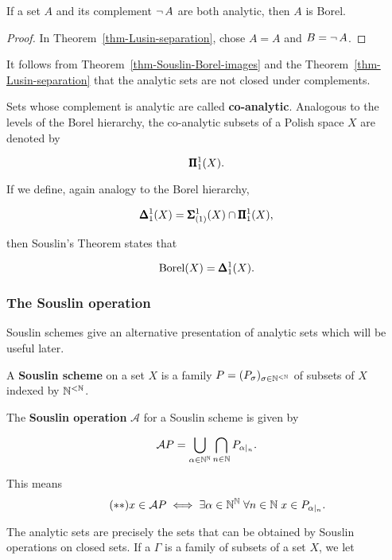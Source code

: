 \begin{theorem}[Souslin]\label{borel-delta11}If a set $A$ and its complement $\neg \, A$ are both analytic, then $A$ is Borel.

\end{theorem}\begin{proof}In Theorem~\ref{thm-Lusin-separation}, chose $A = A$ and $B = \neg \, A$.

\end{proof}It follows from Theorem~\ref{thm-Souslin-Borel-images} and the Theorem~\ref{thm-Lusin-separation} that the analytic sets are not closed under complements.

Sets whose complement is analytic are called \textbf{co-analytic}. Analogous to the levels of the Borel hierarchy, the co-analytic subsets of a Polish space $X$ are denoted by

\begin{equation}
\pmb{\Pi}^1_{1}(X).
\end{equation}

If we define, again analogy to the Borel hierarchy,

\begin{equation}
\pmb{\Delta}^1_1(X) = \pmb{\Sigma}^{1}_{(1)}(X) \cap \pmb{\Pi}^1_{1}(X),
\end{equation}

then Souslin's Theorem states that

\begin{equation}
\operatorname{Borel}(X) = \pmb{\Delta}^1_1(X).
\end{equation}

\subsubsection{The Souslin operation}

Souslin schemes give an alternative presentation of analytic sets which will be useful later.

\begin{definition}A \textbf{Souslin scheme} on a set $X$ is a family $P = (P_\sigma)_{\sigma\in \mathbb{N}^{<\mathbb{N}}}$ of subsets of $X$ indexed by $\mathbb{N}^{<\mathbb{N}}$.

The \textbf{Souslin operation} $\mathcal{A}$ for a Souslin scheme is given by

\begin{equation}
\mathcal{A}P = \bigcup_{\alpha \in \mathbb{N}^{\mathbb{N}}}  \bigcap_{n \in \mathbb{N}} P_{\alpha\mid_{n}}.
\end{equation}

This means
\begin{equation*}
\tag{$**$}
    x \in \mathcal{A}P \iff \exists \alpha \in \mathbb{N}^{\mathbb{N}} \; \forall n \in \mathbb{N} \; x \in P_{\alpha\mid_{n}}.
\end{equation*}
\end{definition}The analytic sets are precisely the sets that can be obtained by Souslin operations on closed sets. If a $\Gamma$ is a family of subsets of a set $X$, we let

